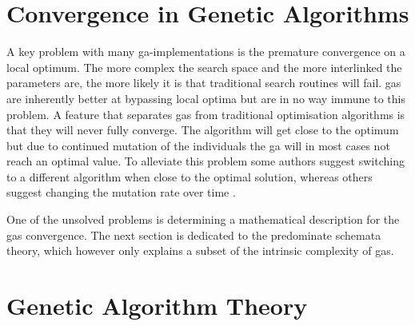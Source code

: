 \section{Convergence in Genetic Algorithms}
A key problem with many \gls{ga}-implementations is the premature convergence on a local optimum. The more complex the search space and the more interlinked the parameters are, the more likely it is that traditional search routines will fail. \glspl{ga} are inherently better at bypassing local optima but are in no way immune to this problem. A feature that separates \glspl{ga} from traditional optimisation algorithms is that they will never fully converge. The algorithm will get close to the optimum but due to continued mutation of the individuals the \gls{ga} will in most cases not reach an optimal value. To alleviate this problem some authors suggest switching to a different algorithm when close to the optimal solution, whereas others suggest changing the mutation rate over time \citep[see][and references therein]{citeulike:344183}.

One of the unsolved problems is determining a mathematical description for the \glspl{ga} convergence. The next section is dedicated to the predominate schemata theory, which however only explains a subset of the intrinsic complexity of \glspl{ga}.

\section{Genetic Algorithm Theory}

